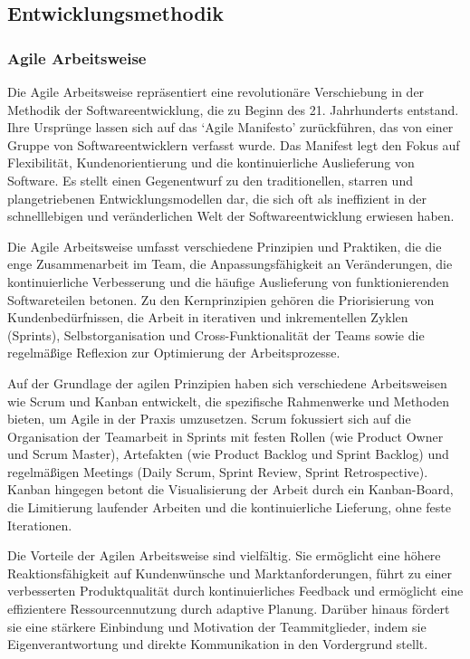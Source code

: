 \documentclass[../main.tex]{subfiles} %
\begin{document}
\subsection{Entwicklungsmethodik}

\subsubsection{Agile Arbeitsweise}

Die Agile Arbeitsweise repräsentiert eine revolutionäre Verschiebung in der Methodik der Softwareentwicklung, die zu Beginn des 21.
Jahrhunderts entstand. Ihre Ursprünge lassen sich auf das `Agile Manifesto' zurückführen, das von einer Gruppe von Softwareentwicklern
verfasst wurde. Das Manifest legt den Fokus auf Flexibilität, Kundenorientierung und die kontinuierliche Auslieferung von Software. Es
stellt einen Gegenentwurf zu den traditionellen, starren und plangetriebenen Entwicklungsmodellen dar, die sich oft als ineffizient in
der schnelllebigen und veränderlichen Welt der Softwareentwicklung erwiesen haben.

Die Agile Arbeitsweise umfasst verschiedene Prinzipien und Praktiken, die die enge Zusammenarbeit im Team, die Anpassungsfähigkeit an
Veränderungen, die kontinuierliche Verbesserung und die häufige Auslieferung von funktionierenden Softwareteilen betonen. Zu den
Kernprinzipien gehören die Priorisierung von Kundenbedürfnissen, die Arbeit in iterativen und inkrementellen Zyklen (Sprints),
Selbstorganisation und Cross-Funktionalität der Teams sowie die regelmäßige Reflexion zur Optimierung der Arbeitsprozesse.

Auf der Grundlage der agilen Prinzipien haben sich verschiedene Arbeitsweisen wie Scrum und Kanban entwickelt, die spezifische
Rahmenwerke und Methoden bieten, um Agile in der Praxis umzusetzen. Scrum fokussiert sich auf die Organisation der Teamarbeit in
Sprints mit festen Rollen (wie Product Owner und Scrum Master), Artefakten (wie Product Backlog und Sprint Backlog) und regelmäßigen
Meetings (Daily Scrum, Sprint Review, Sprint Retrospective). Kanban hingegen betont die Visualisierung der Arbeit durch ein Kanban-Board,
die Limitierung laufender Arbeiten und die kontinuierliche Lieferung, ohne feste Iterationen.

Die Vorteile der Agilen Arbeitsweise sind vielfältig. Sie ermöglicht eine höhere Reaktionsfähigkeit auf Kundenwünsche und Marktanforderungen,
führt zu einer verbesserten Produktqualität durch kontinuierliches Feedback und ermöglicht eine effizientere Ressourcennutzung durch adaptive
Planung. Darüber hinaus fördert sie eine stärkere Einbindung und Motivation der Teammitglieder, indem sie Eigenverantwortung und direkte
Kommunikation in den Vordergrund stellt.
\end{document}
